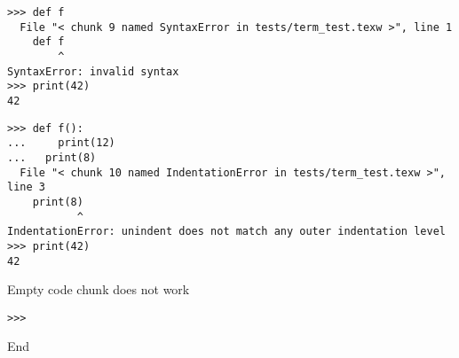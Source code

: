 \begin{verbatim}
>>> def f
  File "< chunk 9 named SyntaxError in tests/term_test.texw >", line 1
    def f
        ^
SyntaxError: invalid syntax
>>> print(42)
42

\end{verbatim}


\begin{verbatim}
>>> def f():
...     print(12)
...   print(8)
  File "< chunk 10 named IndentationError in tests/term_test.texw >",
line 3
    print(8)
           ^
IndentationError: unindent does not match any outer indentation level
>>> print(42)
42

\end{verbatim}

Empty code chunk does not work

\begin{verbatim}
>>>

\end{verbatim}

End


